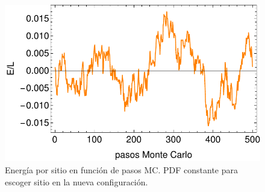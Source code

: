 \documentclass[letterpaper,superscriptaddress,aps,pra,nolongbibliography,twocolumn,showpacs,floatfix,10pt]{revtex4-2} %
\renewcommand{\>}{\rangle}
\newcommand{\<}{\langle}
\begin{document}
\begin{figure}
\centering
\includegraphics[width=0.9\columnwidth]{intento_003}
\caption{Energía por sitio en función de pasos MC. PDF constante
para escoger sitio en la nueva configuración.}
\end{figure}
\end{document}
